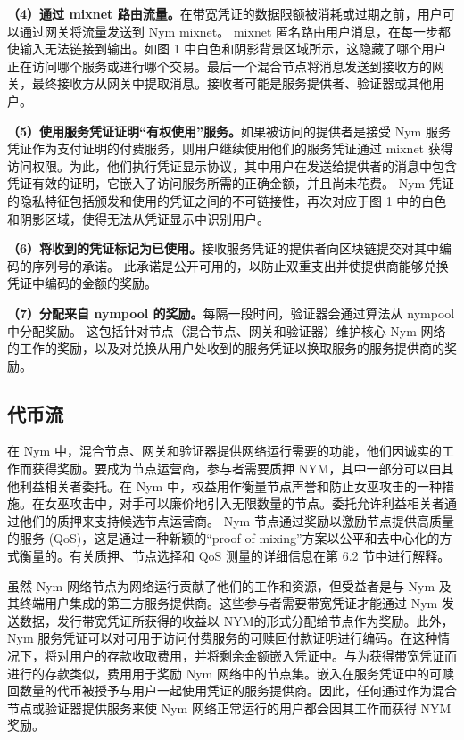 \documentclass{article}
\begin{document}
	\textbf{（4）通过 mixnet 路由流量。}在带宽凭证的数据限额被消耗或过期之前，用户可以通过网关将流量发送到 Nym mixnet。 mixnet 匿名路由用户消息，在每一步都使输入无法链接到输出。如图 1 中白色和阴影背景区域所示，这隐藏了哪个用户正在访问哪个服务或进行哪个交易。最后一个混合节点将消息发送到接收方的网关，最终接收方从网关中提取消息。接收者可能是服务提供者、验证器或其他用户。\newline

	\textbf{（5）使用服务凭证证明“有权使用”服务。}如果被访问的提供者是接受 Nym 服务凭证作为支付证明的付费服务，则用户继续使用他们的服务凭证通过 mixnet 获得访问权限。为此，他们执行凭证显示协议，其中用户在发送给提供者的消息中包含凭证有效的证明，它嵌入了访问服务所需的正确金额，并且尚未花费。 Nym 凭证的隐私特征包括颁发和使用的凭证之间的不可链接性，再次对应于图 1 中的白色和阴影区域，使得无法从凭证显示中识别用户。\newline

	\textbf{（6）将收到的凭证标记为已使用。}接收服务凭证的提供者向区块链提交对其中编码的序列号的承诺。 此承诺是公开可用的，以防止双重支出并使提供商能够兑换凭证中编码的金额的奖励。\newline

	\textbf{（7）分配来自 nympool 的奖励。}每隔一段时间，验证器会通过算法从 nympool 中分配奖励。 这包括针对节点（混合节点、网关和验证器）维护核心 Nym 网络的工作的奖励，以及对兑换从用户处收到的服务凭证以换取服务的服务提供商的奖励。\newline
	
	\subsection{代币流}

	在 Nym 中，混合节点、网关和验证器提供网络运行需要的功能，他们因诚实的工作而获得奖励。要成为节点运营商，参与者需要质押 NYM，其中一部分可以由其他利益相关者委托。在 Nym 中，权益用作衡量节点声誉和防止女巫攻击的一种措施。在女巫攻击中，对手可以廉价地引入无限数量的节点。委托允许利益相关者通过他们的质押来支持候选节点运营商。 Nym 节点通过奖励以激励节点提供高质量的服务 (QoS)，这是通过一种新颖的“proof of mixing”方案以公平和去中心化的方式衡量的。有关质押、节点选择和 QoS 测量的详细信息在第 6.2 节中进行解释。\newline

	虽然 Nym 网络节点为网络运行贡献了他们的工作和资源，但受益者是与 Nym 及其终端用户集成的第三方服务提供商。这些参与者需要带宽凭证才能通过 Nym 发送数据，发行带宽凭证所获得的收益以 NYM的形式分配给节点作为奖励。此外，Nym 服务凭证可以对可用于访问付费服务的可赎回付款证明进行编码。在这种情况下，将对用户的存款收取费用，并将剩余金额嵌入凭证中。与为获得带宽凭证而进行的存款类似，费用用于奖励 Nym 网络中的节点集。嵌入在服务凭证中的可赎回数量的代币被授予与用户一起使用凭证的服务提供商。因此，任何通过作为混合节点或验证器提供服务来使 Nym 网络正常运行的用户都会因其工作而获得 NYM 奖励。\newline
\end{document}
